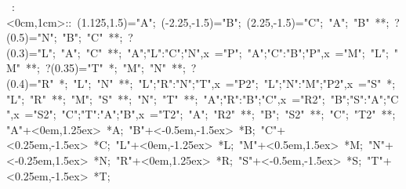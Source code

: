 
%

\hbox{
\xy    <1cm,0cm>:<0cm,1cm>::
       (1.125,1.5)="A"; (-2.25,-1.5)="B"; (2.25,-1.5)="C"; 
       "A"; "B" **\dir{-}; ?(0.5)="N";
       "B"; "C" **\dir{-}; ?(0.3)="L";
       "A"; "C" **\dir{-};
       {"A";"L":"C";"N",x} ="P";   {"A";"C":"B";"P",x} ="M";
%
%
       "L"; "M" **; ?(0.35)="T" *{\bullet};
       "M"; "N" **; ?(0.4)="R" *{\bullet};
       "L"; "N" **;
       {"L";"R":"N";"T",x} ="P2";   {"L";"N":"M";"P2",x} ="S" *{\bullet};
%
       "L"; "R" **\dir{-};
       "M"; "S" **\dir{-};
       "N"; "T" **\dir{-};
%
       {"A";"R":"B";"C",x} ="R2";   {"B";"S":"A";"C",x} ="S2";   {"C";"T":"A";"B",x} ="T2";
       "A"; "R2" **\dir{-};
       "B"; "S2" **\dir{-};
       "C"; "T2" **\dir{-};
%
       "A"+<0em,1.25ex> *{A}; 
       "B"+<-0.5em,-1.5ex> *{B}; 
       "C"+<0.25em,-1.5ex> *{C}; 
%
       "L"+<0em,-1.25ex> *{L}; 
       "M"+<0.5em,1.5ex> *{M}; 
       "N"+<-0.25em,1.5ex> *{N}; 
%
       "R"+<0em,1.25ex> *{R}; 
       "S"+<-0.5em,-1.5ex> *{S}; 
       "T"+<0.25em,-1.5ex> *{T}; 
\endxy}








